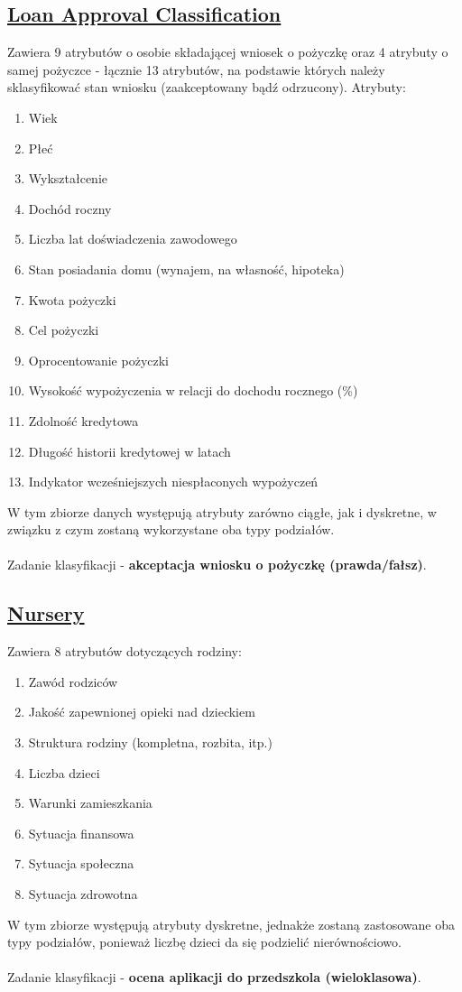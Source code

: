 \documentclass[11pt]{article}
\begin{document}
\subsection{\href{https://www.kaggle.com/datasets/taweilo/loan-approval-classification-data}{Loan Approval Classification}}
\label{sec:org43de68f}
Zawiera 9 atrybutów o osobie składającej wniosek o pożyczkę oraz 4 atrybuty o samej pożyczce - łącznie 13 atrybutów, na podstawie których należy sklasyfikować stan wniosku (zaakceptowany bądź odrzucony). Atrybuty:
\begin{enumerate}
\item Wiek
\item Płeć
\item Wykształcenie
\item Dochód roczny
\item Liczba lat doświadczenia zawodowego
\item Stan posiadania domu (wynajem, na własność, hipoteka)
\item Kwota pożyczki
\item Cel pożyczki
\item Oprocentowanie pożyczki
\item Wysokość wypożyczenia w relacji do dochodu rocznego (\%)
\item Zdolność kredytowa
\item Długość historii kredytowej w latach
\item Indykator wcześniejszych niespłaconych wypożyczeń
\end{enumerate}
W tym zbiorze danych występują atrybuty zarówno ciągłe, jak i dyskretne, w związku z czym zostaną wykorzystane oba typy podziałów.
\\\\
Zadanie klasyfikacji - \textbf{akceptacja wniosku o pożyczkę (prawda/fałsz)}.

\subsection{\href{https://www.kaggle.com/datasets/nimapourmoradi/nursery}{Nursery}}
\label{sec:org0f4e062}
Zawiera 8 atrybutów dotyczących rodziny:
\begin{enumerate}
\item Zawód rodziców
\item Jakość zapewnionej opieki nad dzieckiem
\item Struktura rodziny (kompletna, rozbita, itp.)
\item Liczba dzieci
\item Warunki zamieszkania
\item Sytuacja finansowa
\item Sytuacja społeczna
\item Sytuacja zdrowotna
\end{enumerate}
W tym zbiorze występują atrybuty dyskretne, jednakże zostaną zastosowane oba typy podziałów, ponieważ liczbę dzieci da się podzielić nierównościowo.
\\\\
Zadanie klasyfikacji - \textbf{ocena aplikacji do przedszkola (wieloklasowa)}.
\end{document}
